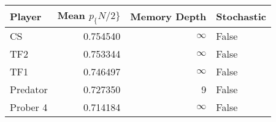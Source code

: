 \begin{tabular}{lrrl}
\toprule
   Player &  Mean $p_\{N/2\}$ &  Memory Depth & Stochastic \\
\midrule
       CS &        0.754540 &            \(\infty\) &      False \\
      TF2 &        0.753344 &            \(\infty\) &      False \\
      TF1 &        0.746497 &            \(\infty\) &      False \\
 Predator &        0.727350 &             9 &      False \\
 Prober 4 &        0.714184 &            \(\infty\) &      False \\
\bottomrule
\end{tabular}
